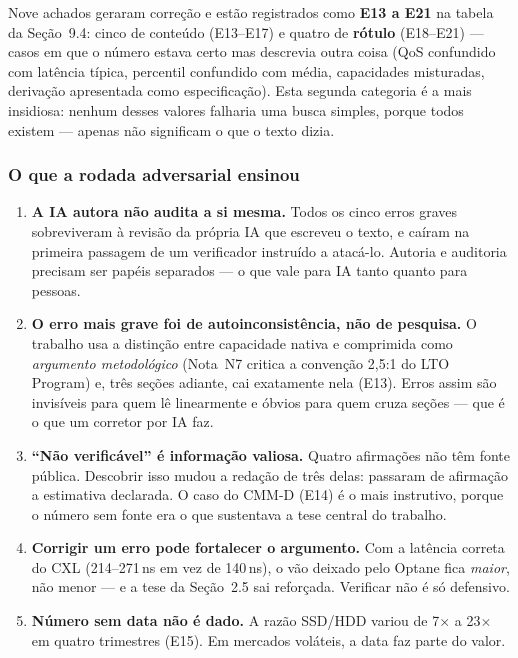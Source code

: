 \documentclass[11pt,a4paper]{article}
\begin{document}
Nove achados geraram correção e estão registrados como \textbf{E13 a E21} na tabela da
Seção~9.4: cinco de conteúdo (E13--E17) e quatro de \textbf{rótulo} (E18--E21) --- casos em
que o número estava certo mas descrevia outra coisa (QoS confundido com latência típica,
percentil confundido com média, capacidades misturadas, derivação apresentada como
especificação). Esta segunda categoria é a mais insidiosa: nenhum desses valores falharia
uma busca simples, porque todos existem --- apenas não significam o que o texto dizia.

\subsubsection*{O que a rodada adversarial ensinou}

\begin{enumerate}[label=\textbf{A\arabic*.}]
\item \textbf{A IA autora não audita a si mesma.} Todos os cinco erros graves sobreviveram à
      revisão da própria IA que escreveu o texto, e caíram na primeira passagem de um
      verificador instruído a atacá-lo. Autoria e auditoria precisam ser papéis separados ---
      o que vale para IA tanto quanto para pessoas.
\item \textbf{O erro mais grave foi de autoinconsistência, não de pesquisa.} O trabalho usa
      a distinção entre capacidade nativa e comprimida como \emph{argumento metodológico}
      (Nota~N7 critica a convenção 2,5:1 do LTO Program) e, três seções adiante, cai
      exatamente nela (E13). Erros assim são invisíveis para quem lê linearmente e óbvios
      para quem cruza seções --- que é o que um corretor por IA faz.
\item \textbf{``Não verificável'' é informação valiosa.} Quatro afirmações não têm fonte
      pública. Descobrir isso mudou a redação de três delas: passaram de afirmação a
      estimativa declarada. O caso do CMM-D (E14) é o mais instrutivo, porque o número sem
      fonte era o que sustentava a tese central do trabalho.
\item \textbf{Corrigir um erro pode fortalecer o argumento.} Com a latência correta do CXL
      (214--271\,ns em vez de 140\,ns), o vão deixado pelo Optane fica \emph{maior}, não
      menor --- e a tese da Seção~2.5 sai reforçada. Verificar não é só defensivo.
\item \textbf{Número sem data não é dado.} A razão SSD/HDD variou de 7$\times$ a 23$\times$
      em quatro trimestres (E15). Em mercados voláteis, a data faz parte do valor.
\end{enumerate}
\end{document}
